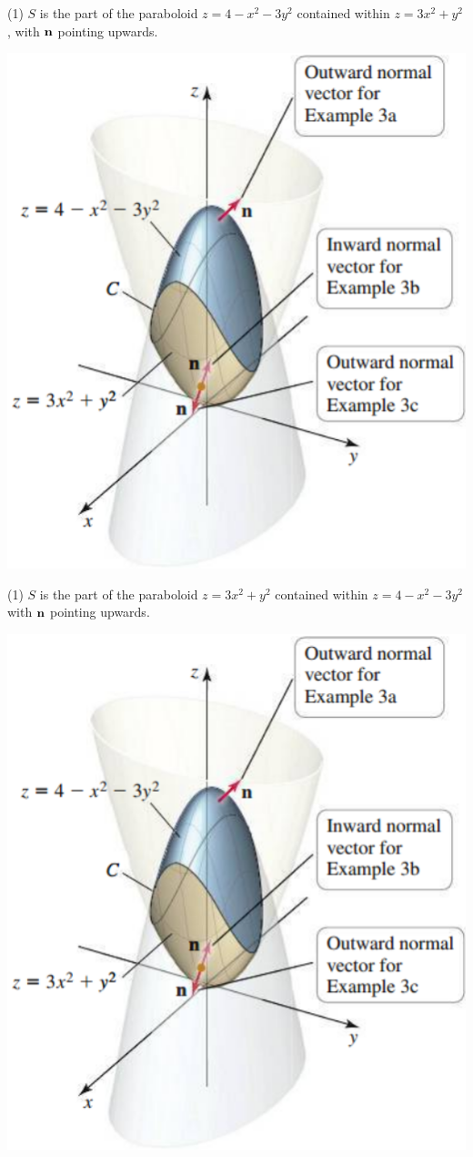 \documentclass[../mathNotesPreamble]{subfiles}
\begin{document}
  \noindent
  \begin{minipage}[t]{0.55\linewidth}
    \begin{tasks}[after-item-skip=\stretch{1}, label=\textbullet, item-indent=0pt](1)
      \task $S$ is the part of the paraboloid $z=4-x^2-3y^2$ contained within $z=3x^2+y^2$, with ${\mathbf{n}}$ pointing upwards.
    \end{tasks}
  \end{minipage}%
  \begin{minipage}[t]{0.45\linewidth}\mbox{}
    \vspace*{-1.5\baselineskip}
    \begin{flushright}
      \includegraphics[width=0.78\linewidth]{../images/briggs_17_07/fig17_63}
    \end{flushright}
  \end{minipage}%
  \pagebreak
  \begin{tasks}[after-item-skip=\stretch{1}, label=\textbullet, item-indent=0pt, resume](1)
    \task $S$ is the part of the paraboloid $z=3x^2+y^2$ contained within $z=4-x^2-3y^2$ with ${\mathbf{n}}$ pointing upwards.
  \end{tasks}
  \begin{flushright}
    \includegraphics[width=0.35\linewidth]{../images/briggs_17_07/fig17_63}
  \end{flushright}
\end{document}
